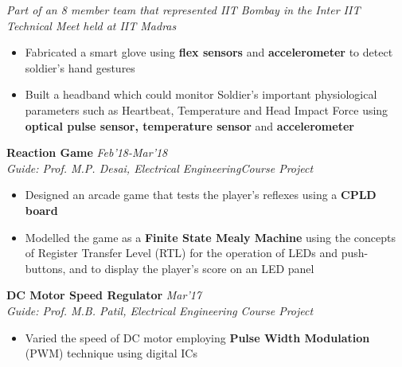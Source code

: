 \documentclass{article}
\begin{document}
{{\it{Part of an 8 member team that represented IIT Bombay in the Inter IIT Technical Meet held at IIT Madras} }\\ \vspace{-15pt}
\begin{itemize}[label=\textcolor{myblue}{\textbullet},itemsep = -0.75 mm, leftmargin=5.5mm]\vspace{-2.5pt}
	\item Fabricated a smart glove using \textbf{flex sensors} and \textbf{accelerometer} to detect soldier's hand gestures
	\item Built a headband which could monitor Soldier's important physiological parameters such as Heartbeat, Temperature and Head Impact Force using \textbf{optical pulse sensor, temperature sensor} and \textbf{accelerometer}
\end{itemize}
\vspace{-2.5pt}
\textbf{\large{Reaction Game}} \hfill{\em Feb'18-Mar'18}\\
{\it{Guide: Prof. M.P. Desai, Electrical Engineering}}\hfill{\it{Course Project}}
\begin{itemize}[label=\textcolor{myblue}{\textbullet},itemsep = -0.75 mm, leftmargin=5.5mm]\vspace{-2.5pt}
	\item Designed an arcade game that tests the player's reflexes using a \textbf{CPLD board} 
	\item Modelled the game as a \textbf{Finite State Mealy Machine} using the concepts of Register Transfer Level (RTL) for the operation of LEDs and push-buttons, and to display the player's score on an LED panel
\end{itemize}
\vspace{-2.5pt}
\textbf{\large{DC Motor Speed Regulator}} \hfill{\em Mar'17}\\
{\it{Guide: Prof. M.B. Patil, Electrical Engineering}}\hfill{ \it{Course Project}}
\begin{itemize}[label=\textcolor{myblue}{\textbullet},itemsep = -0.75 mm, leftmargin=5.5mm]\vspace{-2.5pt}
\item Varied the speed of DC motor employing \textbf{Pulse Width Modulation} (PWM) technique using digital ICs

\end{itemize}}
\end{document}
